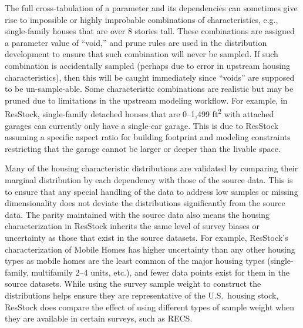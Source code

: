 The full cross-tabulation of a parameter and its dependencies can sometimes give rise to impossible or highly improbable combinations of characteristics, e.g., single-family houses that are over 8 stories tall. These combinations are assigned a parameter value of “void,” and prune rules are used in the distribution development to ensure that such combination will never be sampled. If such combination is accidentally sampled (perhaps due to error in upstream housing characteristics), then this will be caught immediately since ``voids'' are supposed to be un-sample-able. Some characteristic combinations are realistic but may be pruned due to limitations in the upstream modeling workflow. For example, in ResStock, single-family detached houses that are 0--1,499 ft\textsuperscript{2} with attached garages can currently only have a single-car garage. This is due to ResStock assuming a specific aspect ratio for building footprint and modeling constraints restricting that the garage cannot be larger or deeper than the livable space.

Many of the housing characteristic distributions are validated by comparing their marginal distribution by each dependency with those of the source data. This is to ensure that any special handling of the data to address low samples or missing dimensionality does not deviate the distributions significantly from the source data. The parity maintained with the source data also means the housing characterization in ResStock inherits the same level of survey biases or uncertainty as those that exist in the source datasets. For example, ResStock’s characterization of Mobile Homes has higher uncertainty than any other housing types as mobile homes are the least common of the major housing types (single-family, multifamily 2--4 units, etc.), and fewer data points exist for them in the source datasets. While using the survey sample weight to construct the distributions helps ensure they are representative of the U.S.~housing stock, ResStock does compare the effect of using different types of sample weight when they are available in certain surveys, such as RECS.



